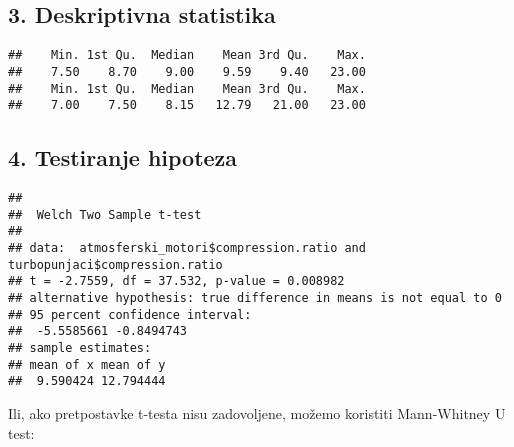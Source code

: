 \documentclass[
]{article}
\newenvironment{Shaded}{\begin{snugshade}}{\end{snugshade}}
\newcommand{\CommentTok}[1]{\textcolor[rgb]{0.56,0.35,0.01}{\textit{#1}}}
\newcommand{\FunctionTok}[1]{\textcolor[rgb]{0.13,0.29,0.53}{\textbf{#1}}}
\newcommand{\NormalTok}[1]{#1}
\newcommand{\SpecialCharTok}[1]{\textcolor[rgb]{0.81,0.36,0.00}{\textbf{#1}}}
\begin{document}
\subsection{3. Deskriptivna statistika}\label{deskriptivna-statistika}

\begin{Shaded}
\end{Shaded}

\begin{verbatim}
##    Min. 1st Qu.  Median    Mean 3rd Qu.    Max. 
##    7.50    8.70    9.00    9.59    9.40   23.00 
##    Min. 1st Qu.  Median    Mean 3rd Qu.    Max. 
##    7.00    7.50    8.15   12.79   21.00   23.00
\end{verbatim}

\subsection{4. Testiranje hipoteza}\label{testiranje-hipoteza}

\begin{Shaded}
\end{Shaded}

\begin{verbatim}
## 
##  Welch Two Sample t-test
## 
## data:  atmosferski_motori$compression.ratio and turbopunjaci$compression.ratio
## t = -2.7559, df = 37.532, p-value = 0.008982
## alternative hypothesis: true difference in means is not equal to 0
## 95 percent confidence interval:
##  -5.5585661 -0.8494743
## sample estimates:
## mean of x mean of y 
##  9.590424 12.794444
\end{verbatim}

Ili, ako pretpostavke t-testa nisu zadovoljene, možemo koristiti
Mann-Whitney U test:

\begin{Shaded}
\end{Shaded}
\end{document}

